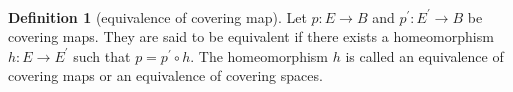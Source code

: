 \documentclass[12pt,a4paper]{book}
\newenvironment{prooff}{{\noindent\it\textcolor{cyan!40!black}{Proof}:}\,}{\par}
\theoremstyle{definition}
\newtheorem{defn}{Definition}[section]
\begin{document}
\begin{prooff}



\end{prooff}
\begin{defn}[equivalence of covering map]
    Let $p: E \rightarrow B$ and $p^{\prime}: E^{\prime} \rightarrow B$ be covering maps. They are said to be equivalent if there exists a homeomorphism $h: E \rightarrow E^{\prime}$ such that $p=p^{\prime} \circ h$. The homeomorphism $h$ is called an equivalence of covering maps or an equivalence of covering spaces.
\end{defn}
\end{document}
